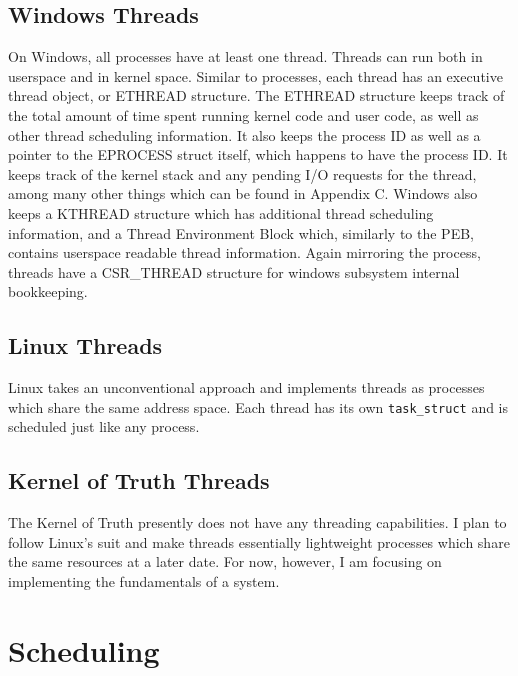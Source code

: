 \documentclass[10pt,conference,draftclsnofoot,onecolumn]{IEEEtran}
\begin{document}
\subsection{Windows Threads}
On Windows, all processes have at least one thread. Threads can run both in userspace and in kernel space. Similar to processes, each thread has an executive thread object, or ETHREAD structure. The ETHREAD structure keeps track of the total amount of time spent running kernel code and user code, as well as other thread scheduling information. It also keeps the process ID as well as a pointer to the EPROCESS struct itself, which happens to have the process ID. It keeps track of the kernel stack and any pending I/O requests for the thread, among many other things which can be found in Appendix C. Windows also keeps a KTHREAD structure which has additional thread scheduling information, and a Thread Environment Block which, similarly to the PEB, contains userspace readable thread information. Again mirroring the process, threads have a CSR\_THREAD structure for windows subsystem internal bookkeeping.

\subsection{Linux Threads}
Linux takes an unconventional approach and implements threads as processes which share the same address space. Each thread has its own \texttt{task\_struct} and is scheduled just like any process.

\subsection{Kernel of Truth Threads}
The Kernel of Truth presently does not have any threading capabilities. I plan to follow Linux's suit and make threads essentially lightweight processes which share the same resources at a later date. For now, however, I am focusing on implementing the fundamentals of a system.

\section{Scheduling}
\end{document}
